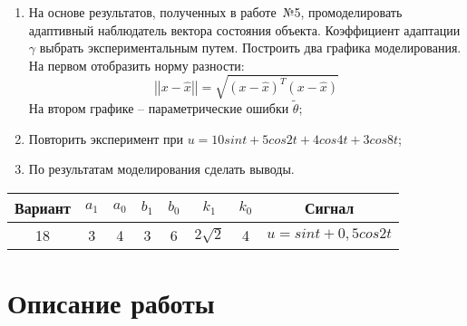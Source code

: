 \documentclass[14pt, a4paper]{extarticle}
\begin{document}
	\begin{enumerate}
		\item На основе результатов, полученных в работе~№5, промоделировать адаптивный наблюдатель вектора состояния объекта. Коэффициент адаптации $\gamma$ выбрать экспериментальным путем. Построить два графика моделирования. На первом отобразить норму разности: $$\left|\left|x-\hat{x}\right|\right|=\sqrt{(x-\hat{x})^T(x-\hat{x})}$$ На втором графике -- параметрические ошибки $\tilde{\theta}$;
		\item Повторить эксперимент при $u=10sint+5cos2t+4cos4t+3cos8t$;
		\item По результатам моделирования сделать выводы.
 	\end{enumerate}
	\begin{table}[H]
		\centering
		\begin{tabular}{|c|c|c|c|c|c|c|c|}
			\hline
			Вариант & $a_1$ & $a_0$ & $b_1$ & $b_0$ & $k_1$ & $k_0$ & Сигнал \\\hline
			18 & 3 & 4 & 3 & 6 & $2\sqrt{2}$ & 4 & $u = sint+0,5cos2t$ \\\hline
		\end{tabular}
	\end{table}
	
	\newpage
	
	\section*{Описание работы}
	
\end{document}
